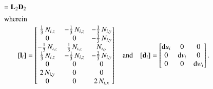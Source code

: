\begin{subequations}
\begin{align}
= \mathbf{L}_2 \mathbf{D}_2 \\
	\intertext{wherein}
	[\mathbf{l}_i] & = \begin{bmatrix}
		\tfrac{1}{3} \,  N_{i,z}  &  - \tfrac{1}{3} \,  N_{i,z}  & - \tfrac{1}{3} \,  N_{i,y}   \\
		0 &  0 & - \tfrac{1}{3} \,  N_{i,y}  \\
		-\tfrac{1}{3} \,  N_{i,z}   & \tfrac{1}{3} \,  N_{i,z}  &  N_{i,y}  \\
		\tfrac{1}{3} \,  N_{i,z}   & -\tfrac{1}{3} \,  N_{i,z}  & -\tfrac{2}{3} \,  N_{i,y}    \\
		0 &  0 & 0  \\
		2 \, N_{i,y} &  0 & 0  \\
		0 &  0 &  2 \,  N_{i,x}   \end{bmatrix}    \quad \text{and} \quad	[\mathbf{d}_i] = \begin{bmatrix}
		\mathrm{d} u_i & 0  & 0  \\
		0 &  \mathrm{d} v_i   & 0  \\
		0 & 0 & \mathrm{d} w_i \end{bmatrix} .
	\end{align}
\end{subequations}

